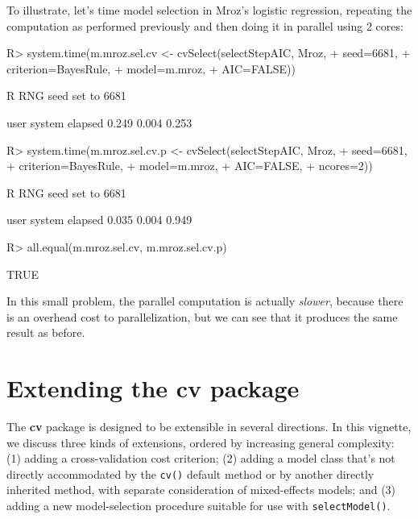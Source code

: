 \documentclass[
]{jss}
\begin{document}
To illustrate, let's time model selection in Mroz's logistic regression,
repeating the computation as performed previously and then doing it in
parallel using 2 cores:

\begin{CodeChunk}
\begin{CodeInput}
R> system.time(m.mroz.sel.cv <- cvSelect(selectStepAIC, Mroz,
+                           seed=6681,
+                           criterion=BayesRule,
+                           model=m.mroz,
+                           AIC=FALSE))
\end{CodeInput}
\begin{CodeOutput}
R RNG seed set to 6681
\end{CodeOutput}
\begin{CodeOutput}
   user  system elapsed 
  0.249   0.004   0.253 
\end{CodeOutput}
\begin{CodeInput}
R> system.time(m.mroz.sel.cv.p <- cvSelect(selectStepAIC, Mroz,
+                           seed=6681,
+                           criterion=BayesRule,
+                           model=m.mroz,
+                           AIC=FALSE,
+                           ncores=2))
\end{CodeInput}
\begin{CodeOutput}
R RNG seed set to 6681
\end{CodeOutput}
\begin{CodeOutput}
   user  system elapsed 
  0.035   0.004   0.949 
\end{CodeOutput}
\begin{CodeInput}
R> all.equal(m.mroz.sel.cv, m.mroz.sel.cv.p)
\end{CodeInput}
\begin{CodeOutput}
[1] TRUE
\end{CodeOutput}
\end{CodeChunk}

In this small problem, the parallel computation is actually
\emph{slower}, because there is an overhead cost to parallelization, but
we can see that it produces the same result as before.

\hypertarget{extending-the-cv-package}{%
\section{Extending the cv package}\label{extending-the-cv-package}}

The \textbf{cv} package is designed to be extensible in several
directions. In this vignette, we discuss three kinds of extensions,
ordered by increasing general complexity: (1) adding a cross-validation
cost criterion; (2) adding a model class that's not directly
accommodated by the \texttt{cv()} default method or by another directly
inherited method, with separate consideration of mixed-effects models;
and (3) adding a new model-selection procedure suitable for use with
\texttt{selectModel()}.
\end{document}
